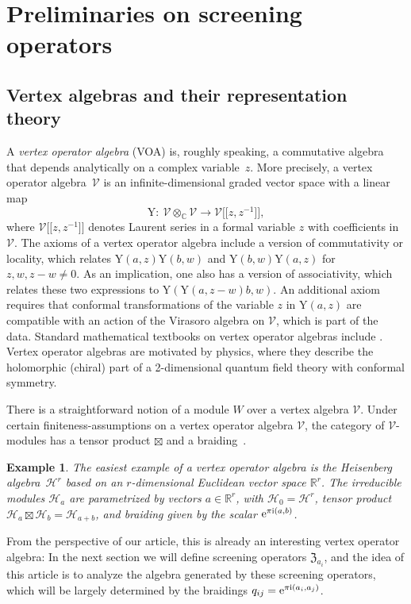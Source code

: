 \documentclass[10pt,a4paper]{amsart}
\numberwithin{equation}{section}
\newtheorem{ese}[teo]{Example}
\newcommand{\C}{\mathbb{C}}
\newcommand{\Y}{\mathrm{Y}}
\newcommand{\zem}{\mathfrak{Z}}
\begin{document}
\newcommand{\V}{\mathcal{V}}
\section{Preliminaries on screening operators}\label{section3}
\subsection{Vertex algebras and their representation theory}\label{VOAREP}
A \emph{vertex operator algebra} (VOA) is, roughly speaking, a commutative algebra that depends analytically on a complex variable~$z$. More precisely, a vertex operator algebra~$\V$ is an infinite-dimensional graded vector space with a linear map
\[\Y\colon \ \V\otimes_\C \V\to \V\big[\big[z,z^{-1}\big]\big],\]
where $\V\big[\big[z,z^{-1}\big]\big]$ denotes Laurent series in a formal variable $z$ with coefficients in~$\V$. The axioms of a vertex operator algebra include a version of commutativity or locality, which relates $\Y(a,z)\Y(b,w)$ and $\Y(b,w)\Y(a,z)$ for $z,w,z-w\neq 0$. As an implication, one also has a version of associativity, which relates these two expressions to $\Y(\Y(a,z-w)b,w)$.
An additional axiom requires that conformal transformations of the variable $z$ in $\Y(a,z)$ are compatible with an action of the Virasoro algebra on $\V$, which is part of the data. Standard mathematical textbooks on vertex operator algebras include \cite{FBZ04, Kac98}. Vertex operator algebras are motivated by physics, where they describe the holomorphic (chiral) part of a 2-dimensional quantum field theory with conformal symmetry.

There is a straightforward notion of a module $W$ over a vertex algebra $\V$. Under certain finiteness-assumptions on a vertex operator algebra $\mathcal{V}$, the category of $\mathcal{V}$-modules has a tensor product $\boxtimes$ and a braiding~\cite{HLZ10}.

\begin{ese}
 The easiest example of a vertex operator algebra is the Heisenberg algebra~$\mathcal{H}^r$ based on an $r$-dimensional Euclidean vector space $\mathbb{R}^r$. The irreducible modules $\mathcal{H}_a$ are pa\-ra\-met\-ri\-zed by vectors $a\in\mathbb{R}^r$, with $\mathcal{H}_0=\mathcal{H}^r$, tensor product $\mathcal{H}_a\boxtimes \mathcal{H}_b=\mathcal{H}_{a+b}$, and braiding given by the scalar ${\rm e}^{\pi {\rm i}(a,b)}$.
\end{ese}

From the perspective of our article, this is already an interesting vertex operator algebra: In the next section we will define screening operators $\zem_{a_i}$, and the idea of this article is to analyze the algebra generated by these screening operators, which will be largely determined by the braidings $q_{ij}={\rm e}^{\pi {\rm i}(a_i,a_j)}$.
\end{document}

